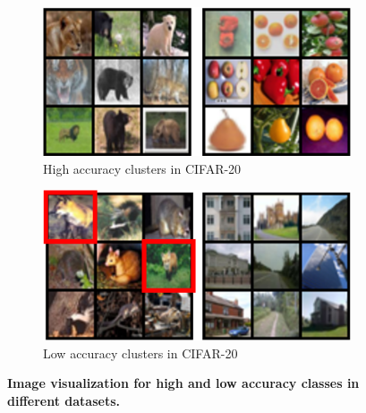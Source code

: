 \documentclass{article}
\begin{document}
\begin{figure}[hbt]
     \begin{subfigure}[b]{0.48\textwidth}
         \centering
         \includegraphics[width=\textwidth]{images/high_accuracy_cifar20.png}
         \caption{High accuracy clusters in CIFAR-20}
         \label{fig:high_cifar20}
     \end{subfigure}
     \hfill
     \begin{subfigure}[b]{0.48\textwidth}
         \centering
         \includegraphics[width=\textwidth]{images/low_accuracy_cifar20.png}
         \caption{Low accuracy clusters in CIFAR-20}
         \label{fig:low_cifar20}
     \end{subfigure}
     \caption{\textbf{Image visualization for high and low accuracy classes in different datasets.}}
     \label{fig:visualization}
\end{figure}
\end{document}

